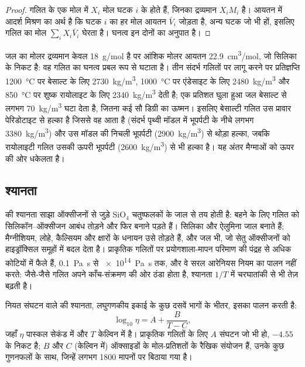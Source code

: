 \begin{proof}
गलित के एक मोल में $X_i$ मोल घटक $i$ के होते हैं, जिनका द्रव्यमान $X_iM_i$ है। आयतन में आदर्श
मिश्रण का अर्थ है कि घटक $i$ का हर मोल आयतन $\bar V_i$ जोड़ता है,
अन्य घटक जो भी हों, इसलिए गलित का मोल $\sum_i X_i\bar V_i$ घेरता है।
घनत्व इन दोनों का अनुपात है।
\end{proof}

जल का मोलर द्रव्यमान केवल \qty{18}{g/mol} है पर आंशिक मोलर आयतन
\qty{22.9}{cm^3/mol}, जो सिलिका के निकट है: वह गलित का घनत्व
प्रबल रूप से घटाता है। तीन संदर्भ गलितों पर लागू करने पर प्रतिज्ञप्ति
\qty{1200}{\celsius} पर बेसाल्ट के लिए \qty{2730}{kg/m^3}, \qty{1000}{\celsius} पर
एंडेसाइट के लिए \qty{2480}{kg/m^3} और \qty{850}{\celsius} पर शुष्क रायोलाइट के लिए \qty{2340}{kg/m^3}
देती है; एक प्रतिशत घुला हुआ जल बेसाल्ट से लगभग
\qty{70}{kg/m^3} घटा देता है, जितना कई सौ डिग्री का ऊष्मन।
इसलिए बेसाल्टी गलित उस प्रावार पेरिडोटाइट से हल्का है जिससे वह आता है
(संदर्भ पृथ्वी मॉडल में भूपर्पटी के नीचे लगभग \qty{3380}{kg/m^3}) और उस मॉडल की
निचली भूपर्पटी (\qty{2900}{kg/m^3}) से थोड़ा हल्का, जबकि
रायोलाइटी गलित उसकी ऊपरी भूपर्पटी (\qty{2600}{kg/m^3}) से भी हल्का है। यह अंतर मैग्माओं को
ऊपर की ओर धकेलता है।

\subsection{श्यानता}

 की श्यानता साझा ऑक्सीजनों से जुड़े SiO$_4$ चतुष्फलकों के जाल
से तय होती है: बहने के लिए गलित को
सिलिकॉन--ऑक्सीजन आबंध तोड़ने और फिर बनाने पड़ते हैं। सिलिका और ऐलुमिना जाल बनाते हैं;
मैग्नीशियम, लोहे, कैल्सियम और क्षारों के धनायन उसे तोड़ते हैं, और जल भी, जो
सेतु ऑक्सीजनों को हाइड्रॉक्सिल समूहों में बदल देता है। प्राकृतिक
गलितों पर प्रयोगशाला-मापन परिमाण की पंद्रह से अधिक कोटियों में फैले हैं, \qty{0.1}{Pa.s} से
\qty{e14}{Pa.s} तक, और वे सरल आरेनियस नियम का पालन नहीं करते: जैसे-जैसे गलित अपने काँच-संक्रमण
की ओर ठंडा होता है, श्यानता $1/T$ में चरघातांकी से भी तेज़
बढ़ती है।

\begin{proposition}[फ़ोगेल--फ़ुल्चर--टैमान नियम]\label{prop:b2:magma-emplacement:vft}
नियत संघटन वाले  की श्यानता, लघुगणकीय इकाई के कुछ
दसवें भागों के भीतर, इसका पालन करती है:
\[
\log_{10}\eta = A + \frac{B}{T - C},
\]
जहाँ $\eta$ पास्कल सेकंड में और $T$ केल्विन में है। प्राकृतिक गलितों के लिए $A$ संघटन जो भी हो,
$-4.55$ के निकट है; $B$ और $C$ (केल्विन में) ऑक्साइडों के मोल-प्रतिशतों के रैखिक
संयोजन हैं, उनके कुछ गुणनफलों के साथ, जिन्हें लगभग \num{1800} मापनों पर
बिठाया गया है।
\end{proposition}
\admitted

